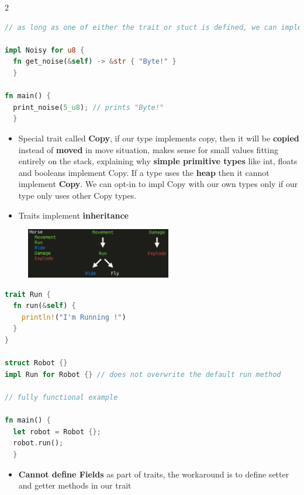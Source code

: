 \documentclass{report}
\begin{document}
\begin{multicols*}{2}
\begin{tcolorbox}[title=Example,colback=backcolour,size=small,left=4mm]
\begin{lstlisting}[language=rust]
  // as long as one of either the trait or stuct is defined, we can implement any trait for any struct, including builtin or import types from other packages

impl Noisy for u8 {
  fn get_noise(&self) -> &str { "Byte!" }
  }

fn main() {
  print_noise(5_u8); // prints "Byte!"
  }
\end{lstlisting}
\end{tcolorbox}

\begin{itemize}
  \item Special trait called \textbf{Copy}, if our type implements copy, then it will be \textbf{copied} instead of \textbf{moved} in move situation,
    makes sense for small values fitting entirely on the stack, explaining why \textbf{simple primitive types} like int, floats and booleans implement Copy. If a type uses the \textbf{heap} then it cannot implement \textbf{Copy}. We can opt-in to impl Copy with our own types only if
    our type only uses other Copy types. 
  \item Traits implement \textbf{inheritance}
\end{itemize}

\begin{figure}[H] 
	 \centering 
	 \includegraphics[width=2.5in]{screenshots/2022-07-17T11-58-25Z.png} 
 \end{figure}


\begin{tcolorbox}[title=Traits can also have default behaviours,colback=backcolour,size=small,left=4mm]
\begin{lstlisting}[language=rust]
trait Run {
  fn run(&self) {
    println!("I'm Running !")
  }
}

struct Robot {}
impl Run for Robot {} // does not overwrite the default run method

// fully functional example

fn main() {
  let robot = Robot {};
  robot.run();
  }
\end{lstlisting}
\end{tcolorbox}

\begin{itemize}
  \item \textbf{Cannot define Fields} as part of traits, the workaround is to define setter and getter methods in our trait 
\end{itemize}


\end{multicols*}
\end{document}
